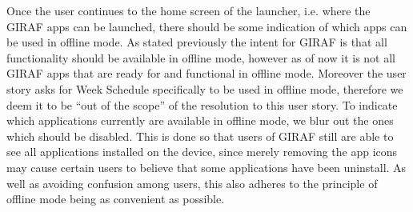 \bigskip

Once the user continues to the home screen of the launcher, i.e. where the GIRAF apps can be launched, there should be some indication of which apps can be used in offline mode. 
As stated previously the intent for GIRAF is that all functionality should be available in offline mode, however as of now it is not all GIRAF apps that are ready for and functional in offline mode.
Moreover the user story asks for Week Schedule specifically to be used in offline mode, therefore we deem it to be \enquote{out of the scope} of the resolution to this user story.
To indicate which applications currently are available in offline mode, we blur out the ones which should be disabled.
This is done so that users of GIRAF still are able to see all applications installed on the device, since merely removing the app icons may cause certain users to believe that some applications have been uninstall.
As well as avoiding confusion among users, this also adheres to the principle of offline mode being as convenient as possible.


